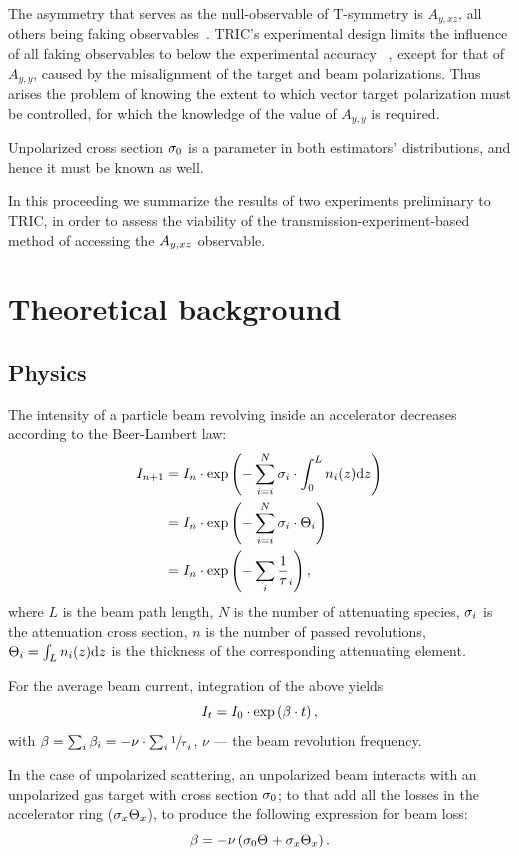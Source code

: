 \documentclass[reprint, superscriptaddress]{revtex4-1}
\newcommand{\td}{\mathrm{d}}
\begin{document}
The asymmetry that serves as the null-observable of T-symmetry is $A_{y,xz}$, all others being faking observables~\cite{Conzett}. TRIC's experimental design limits the influence of all faking observables to below the experimental accuracy ~\cite{Proposal}, except for that of $A_{y,y}$, caused by the misalignment of the target and beam polarizations. Thus arises the problem of knowing the extent to which vector target polarization must be controlled, for which the knowledge of the value of $A_{y,y}$ is required. 

Unpolarized cross section $\CS[0]$ is a parameter in both estimators' distributions, and hence it must be known as well. 

In this proceeding we summarize the results of two experiments preliminary to TRIC, in order to assess the viability of the transmission-experiment-based method of accessing the $\Ayxz$ observable.

\section{Theoretical background}
\subsection{Physics}
The intensity of a particle beam revolving inside an accelerator decreases according to the Beer-Lambert law:
\begin{align*}
	I_{n+1} &= I_n \cdot \exp\bkt{-\sum_{i=i}^N \CS[i]\cdot\int_0^L n_i(z)\td z} \\
			&= I_n \cdot \exp\bkt{-\sum_{i=i}^N \CS[i]\cdot \Thick[i]} \\
			&= I_n \cdot \exp\bkt{-\sum_i\frac1\tau_i},
\end{align*}
where $L$ is the beam path length, $N$ is the number of attenuating species, $\CS[i]$ is the attenuation cross section, $n$ is the number of passed revolutions, $\Thick[i] = \int_L n_i(z)\td z$ is the thickness of the corresponding attenuating element.

For the average beam current, integration of the above yields
\begin{equation}\label{eq:CurrentDecay}
	I_t = I_0 \cdot \exp\bkt{\slp\cdot t},
\end{equation}
with $\slp = \sum_i \slp[i] = - \nu\cdot\sum_i \sfrac1\tau_i$, $\nu$ --- the beam revolution frequency. 

In the case of unpolarized scattering, an unpolarized beam interacts with an unpolarized gas target with cross section $\CS[0]$; to that add all the losses in the accelerator ring ($\CS[x]\Thick[x]$), to produce the following expression for beam loss:
\begin{equation}\label{eq:SlopeModel}
	\slp = -\nu\bkt{\CS[0]\Thick + \CS[x]\Thick[x]}.
\end{equation}
\end{document}
